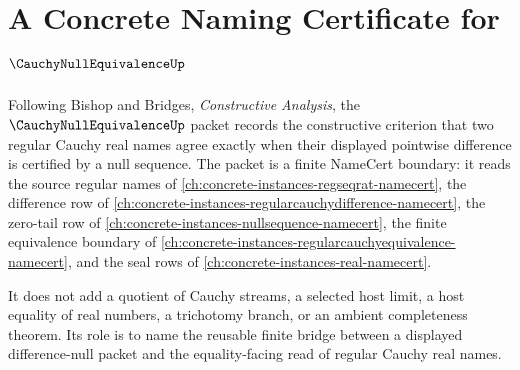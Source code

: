 \chapter{A Concrete Naming Certificate for $\CauchyNullEquivalenceUp$}
\label{ch:concrete-instances-cauchynullequivalence-namecert}

Following Bishop and Bridges, \emph{Constructive Analysis}, the $\CauchyNullEquivalenceUp$ packet records the constructive criterion that two regular Cauchy real names agree exactly when their displayed pointwise difference is certified by a null sequence. The packet is a finite NameCert boundary: it reads the source regular names of \autoref{ch:concrete-instances-regseqrat-namecert}, the difference row of \autoref{ch:concrete-instances-regularcauchydifference-namecert}, the zero-tail row of \autoref{ch:concrete-instances-nullsequence-namecert}, the finite equivalence boundary of \autoref{ch:concrete-instances-regularcauchyequivalence-namecert}, and the seal rows of \autoref{ch:concrete-instances-real-namecert}.

It does not add a quotient of Cauchy streams, a selected host limit, a host equality of real numbers, a trichotomy branch, or an ambient completeness theorem. Its role is to name the reusable finite bridge between a displayed difference-null packet and the equality-facing read of regular Cauchy real names.


